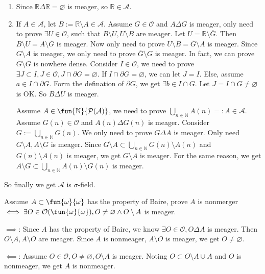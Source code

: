 \documentclass{ctexart}
\begin{document}
\begin{solution}
  \begin{enumerate}
    \item Since \(\mathbb{R} \Delta \mathbb{R} = \varnothing\) is meager, so \(\mathbb{R} \in \mathcal{A}\). 
    \item  If \(A \in \mathcal{A}\), let \(B:=\mathbb{R} \setminus A \in \mathcal{A}\). 
  Assume \(G \in \mathcal{O}\) and \( A \Delta G\) is meager,  
  only need to prove \(\exists U \in \mathcal{O}\), such that \(B\setminus U,U\setminus B\) are meager. 
  Let \(U=\mathbb{R} \setminus \overline{G}\). Then \(B \setminus U = A \setminus \overline{G}\) is meager. 
  Now only need to prove \(U \setminus B = \overline{ G}\setminus A\) is meager. 
  Since \(G \setminus A\) is meager, we only need to prove \(\overline{G}\setminus G\) is meager. 
  In fact, we can prove \(\overline{G}\setminus G\) is nowhere dense. 
  Consider \(I \in \mathcal{O}\), we need to prove \(\exists J \subset I,J \in \mathcal{O}, J \cap \partial G = \varnothing\). 
  If \(I \cap \partial G = \varnothing\), we can let \(J = I\). 
  Else, assume \( a \in I \cap \partial G\). Form the defination of \(\partial G\), 
  we get \(\exists b \in I \cap G\). Let \(J = I \cap G \neq \varnothing\) is OK. 
  So \(B \Delta U\) is meager. 

  Assume \(A \in \fun{\mathbb{N}}{\mathcal{P}(\mathcal{A})}\), we need to prove \(\bigcup_{n \in \mathbb{N}} A(n)=:A \in \mathcal{A}\). 
  Assume \(G(n) \in \mathcal{O}\) and \(A(n) \Delta G(n)\) is meager. Consider \(G:= \bigcup_{ n \in \mathbb{N}} G(n)\). 
  We only need to prove \(G \Delta A\) is meager. Only need \(G \setminus A,A \setminus G\) is meager. 
  Since \(G \setminus A \subset \bigcup_{n \in \mathbb{N}} G(n) \setminus A(n)\) and \(G(n)\setminus A(n)\) is meager, we get \(G \setminus A\) is meager. 
  For the same reason, we get \(A \setminus G \subset \bigcup_{n \in \mathbb{N}} A(n)\setminus G(n)\) is meager. 

  \end{enumerate}
  So finally we get \(\mathcal{A}\) is \(\sigma\)-field. 
\end{solution}

\begin{problem}
  Assume \(A \subset \fun{\omega}{\omega}\) has the property of Baire, prove \(A\) is nonmerger \(\iff \exists O \in \mathcal{O}(\fun{\omega}{\omega}),O \neq \varnothing \wedge O\setminus A\) is meager. 
\end{problem}
\iffalse
\begin{solution}
  \(\implies\): Since \(A\) has the property of Baire, we know \(\exists O \in \mathcal{O},O \Delta A\) is meager. 
  Then \(O \setminus A,A \setminus O\) are meager. Since \(A\) is nonmeager, \(A \setminus O\) is meager, we get \(O \neq \varnothing\). 

  \(\impliedby\): Assume \(O \in \mathcal{O}, O \neq \varnothing, O \setminus A\) is meager. 
 Noting \(O \subset O \setminus A \cup A\) and \(O\) is nonmeager, we get \(A\) is nonmeager. 
\end{solution}
\end{document}
